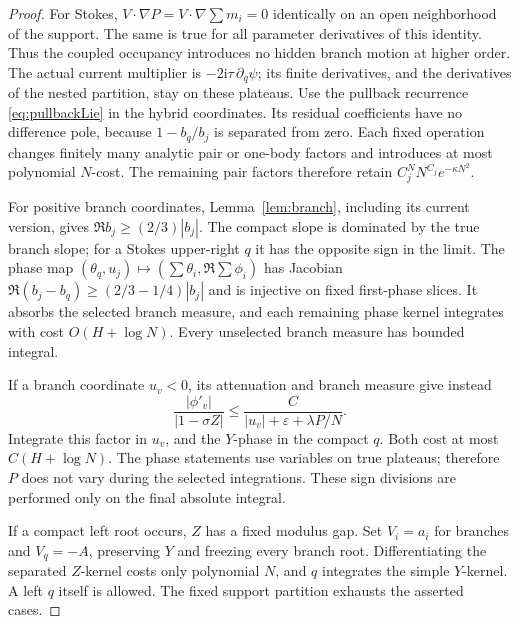 \documentclass[11pt]{article}
\numberwithin{equation}{section}
\theoremstyle{definition}
\newcommand{\ii}{\mathrm i}
\newcommand{\eps}{\varepsilon}
\begin{document}
\begin{proof}
For Stokes, \(V\cdot\nabla P=V\cdot\nabla\sum m_i=0\) identically
on an open neighborhood of the support. The same is true for
all parameter derivatives of this identity. Thus the coupled
occupancy introduces no hidden branch motion at higher order.
The actual current multiplier is
\(-2\ii\tau\,\partial_q\psi\); its finite derivatives, and the
derivatives of the nested partition, stay on these plateaus.
Use the pullback recurrence \eqref{eq:pullbackLie} in the hybrid
coordinates. Its residual coefficients have no difference pole,
because \(1-b_q/b_j\) is separated from zero. Each fixed operation
changes finitely many analytic pair or one-body factors and
introduces at most polynomial \(N\)-cost. The remaining pair
factors therefore retain
\(C_j^N N^{C_j}e^{-\kappa N^2}\).

For positive branch coordinates, Lemma~\ref{lem:branch}, including
its current version, gives \(\Re b_j\ge(2/3)|b_j|\).
The compact slope is dominated by the true branch slope; for a
Stokes upper-right \(q\) it has the opposite sign in the limit.
The phase map
\((\theta_q,u_j)\mapsto(\sum\theta_i,\Re\sum\phi_i)\)
has Jacobian \(\Re(b_j-b_q)\ge(2/3-1/4)|b_j|\)
and is injective on fixed first-phase slices.
It absorbs the selected branch measure, and each remaining phase
kernel integrates with cost \(O(H+\log N)\).
Every unselected branch measure has bounded integral.

If a branch coordinate \(u_v<0\), its attenuation and branch measure
give instead
\[
 \frac{|\phi'_v|}{|1-\sigma Z|}
 \le\frac C{|u_v|+\eps+\lambda P/N}.
\]
Integrate this factor in \(u_v\), and the \(Y\)-phase in the compact
\(q\). Both cost at most \(C(H+\log N)\).
The phase statements use variables on true plateaus; therefore \(P\)
does not vary during the selected integrations.
These sign divisions are performed only on the final absolute integral.

If a compact left root occurs, \(Z\) has a fixed modulus gap.
Set \(V_i=a_i\) for branches and \(V_q=-A\), preserving \(Y\)
and freezing every branch root. Differentiating the separated
\(Z\)-kernel costs only polynomial \(N\), and \(q\) integrates
the simple \(Y\)-kernel. A left \(q\) itself is allowed.
The fixed support partition exhausts the asserted cases.
\end{proof}
\end{document}
